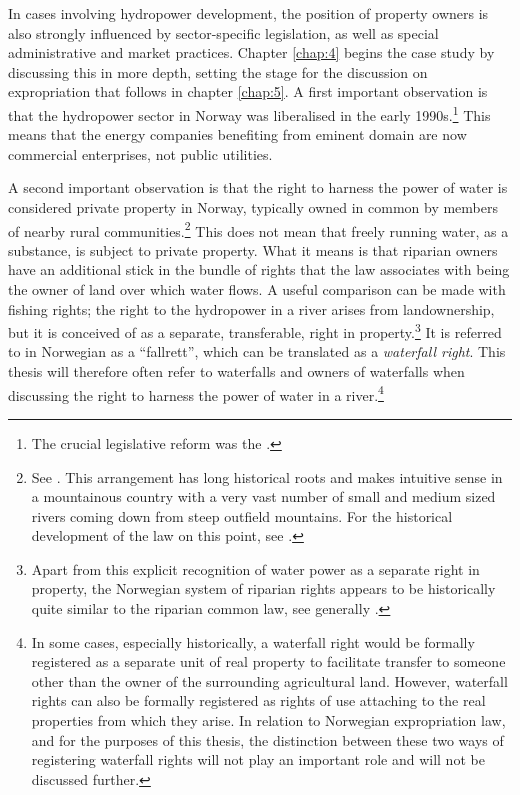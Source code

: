 In cases involving hydropower development, the position of property owners is also strongly influenced by sector-specific legislation, as well as special administrative and market practices. Chapter \ref{chap:4} begins the case study by discussing this in more depth, setting the stage for the discussion on expropriation that follows in chapter \ref{chap:5}. A first important observation is that the hydropower sector in Norway was liberalised in the early 1990s.\footnote{The crucial legislative reform was the \cite{ea90}.} This means that the energy companies benefiting from eminent domain are now commercial enterprises, not public utilities.

A second important observation is that the right to harness the power of water is considered private property in Norway, typically owned in common by members of nearby rural communities.\footnote{See \dni\cite[13]{wra00}. This arrangement has long historical roots and makes intuitive sense in a mountainous country with a very vast number of small and medium sized rivers coming down from steep outfield mountains. For the historical development of the law on this point, see \cite[109-116]{nordtveit15}.} This does not mean that freely running water, as a substance, is subject to private property. What it means is that riparian owners have an additional stick in the bundle of rights that the law associates with being the owner of land over which water flows. A useful comparison can be made with fishing rights; the right to the hydropower in a river arises from landownership, but it is conceived of as a separate, transferable, right in property.\footnote{Apart from this explicit recognition of water power as a separate right in property, the Norwegian system of riparian rights appears to be historically quite similar to the riparian common law, see generally \cite{howarth15}.} It is referred to in Norwegian as a ``fallrett'', which can be translated as a {\it waterfall right}. This thesis will therefore often refer to waterfalls and owners of waterfalls when discussing the right to harness the power of water in a river.\footnote{In some cases, especially historically, a waterfall right would be formally registered as a separate unit of real property to facilitate transfer to someone other than the owner of the surrounding agricultural land. However, waterfall rights can also be formally registered as rights of use attaching to the real properties from which they arise. In relation to Norwegian expropriation law, and for the purposes of this thesis, the distinction between these two ways of registering waterfall rights will not play an important role and will not be discussed further.}

